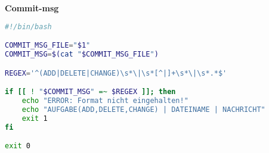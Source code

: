 \textbf{Commit-msg}
\begin{lstlisting}[language=bash]
#!/bin/bash

COMMIT_MSG_FILE="$1"
COMMIT_MSG=$(cat "$COMMIT_MSG_FILE")

REGEX='^(ADD|DELETE|CHANGE)\s*\|\s*[^|]+\s*\|\s*.*$'

if [[ ! "$COMMIT_MSG" =~ $REGEX ]]; then
    echo "ERROR: Format nicht eingehalten!"
    echo "AUFGABE(ADD,DELETE,CHANGE) | DATEINAME | NACHRICHT"
    exit 1
fi

exit 0
\end{lstlisting}
